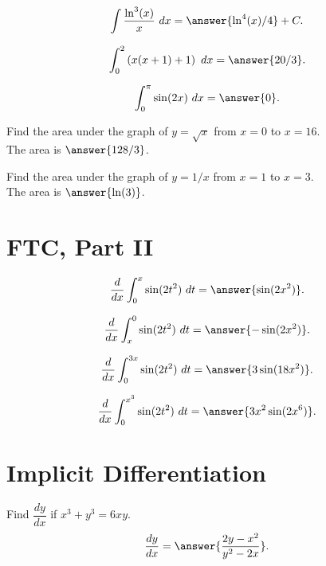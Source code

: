 \documentclass{ximera}
\begin{document}
\begin{problem}
\[\int \frac{\ln^3(x)}{x} \ dx = \answer{\ln^4(x) /4} + C.\]
\end{problem}

\begin{problem}
\[\int_0^2  \left(x(x+1) + 1 \right) \ dx = \answer{20/3}.\]
\end{problem}

\begin{problem}
\[\int_0^\pi  \sin(2x) \ dx = \answer{0}.\]
\end{problem}

\begin{problem}
Find the area under the graph of $y = \sqrt x$ from $x=0$ to $x=16$.\\
The area is $\answer{128/3}$.
\end{problem}

\begin{problem}
Find the area under the graph of $y = 1/x$ from $x=1$ to $x=3$.\\
The area is $\answer{\ln(3)}$.
\end{problem}


\section{FTC, Part II}

\begin{problem}
\[\frac{d}{dx} \int_0^x \sin(2t^2) \ dt = \answer{\sin(2x^2)}.\]
\end{problem}

\begin{problem}
\[\frac{d}{dx} \int_x^0 \sin(2t^2) \ dt = \answer{-\sin(2x^2)}.\]
\end{problem}

\begin{problem}
\[\frac{d}{dx} \int_0^{3x} \sin(2t^2) \ dt = \answer{3\sin(18x^2)}.\]
\end{problem}

\begin{problem}
\[\frac{d}{dx} \int_0^{x^3} \sin(2t^2) \ dt = \answer{3x^2\sin(2x^6)}.\]
\end{problem}



\section{Implicit Differentiation}

\begin{problem}
Find $\dfrac{dy}{dx}$ if $x^3 + y^3 = 6xy$.
\[\frac{dy}{dx} = \answer{\frac{2y - x^2}{y^2 - 2x}}.\]
\end{problem}
\end{document}

